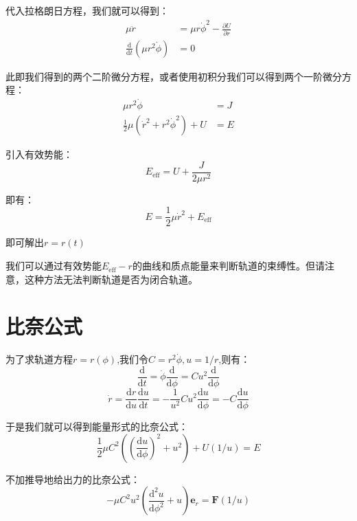 \documentclass[a4paper, 10pt, openany]{book}%
\begin{document}
  代入拉格朗日方程，我们就可以得到：
  \begin{align}\mu\ddot{r}&=\mu r\dot{\phi}^2-\frac{\partial U}{\partial r} \\
    \frac{\mathrm{d}}{\mathrm{d}t}(\mu r^2\dot{\phi})&=0\end{align}

    此即我们得到的两个二阶微分方程，或者使用初积分我们可以得到两个一阶微分方程：
    \begin{align}\mu r^2\dot{\phi}&=J\\
    \frac{1}{2}\mu (\dot{r}^2+r^2\dot{\phi}^2)+U&=E\end{align}
   
    引入有效势能：
    \begin{equation}E_{\text{eff}}=U+\frac{J}{2\mu r^2}\end{equation}
    
    即有：
    \begin{equation}E=\frac{1}{2}\mu \dot{r}^2+E_\text{eff}\end{equation}

    即可解出$r=r(t)$

    我们可以通过有效势能$E_{\text{eff}}-r$的曲线和质点能量来判断轨道的束缚性。但请注意，这种方法无法判断轨道是否为闭合轨道。
    
    \section{比奈公式}
    为了求轨道方程$r=r(\phi)$,我们令$C=r^2\dot{\phi},u=1/r$,则有：
    \begin{equation}\frac{\mathrm{d}}{\mathrm{d}t}=\dot{\phi}\frac{\mathrm{d}}{\mathrm{d}\phi}=Cu^2\frac{\mathrm{d}}{\mathrm{d}\phi}\end{equation}
      \begin{equation}\dot{r}=\frac{\mathrm{d}r}{\mathrm{d}u}\frac{\mathrm{d}u}{\mathrm{d}t}=-\frac{1}{u^2}Cu^2\frac{\mathrm{d}u}{\mathrm{d}\phi}=-C\frac{\mathrm{d}u}{\mathrm{d}\phi}\end{equation}
    
      于是我们就可以得到能量形式的比奈公式：
    \begin{equation}\frac{1}{2}\mu C^2((\frac{\mathrm{d}u}{\mathrm{d}\phi})^2+u^2)+U(1/u)=E\end{equation}
    
    不加推导地给出力的比奈公式：
    \begin{equation}-\mu C^2u^2(\frac{\mathrm{d}^2u}{\mathrm{d}\phi^2}+u)\textbf{e}_r=\textbf{F}(1/u)\end{equation}
    
\end{document}
